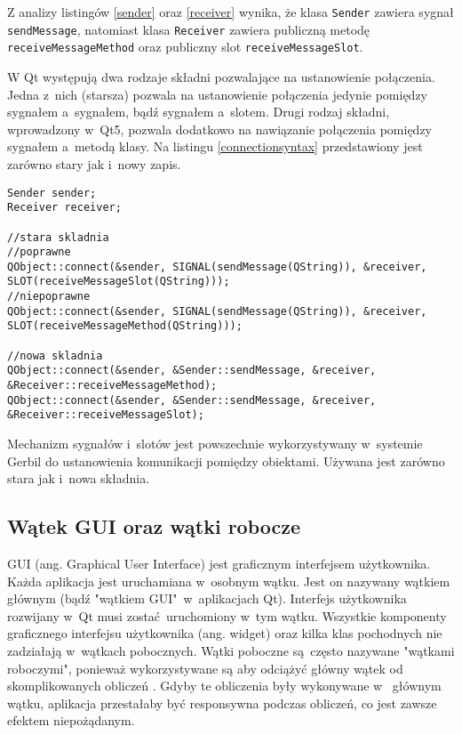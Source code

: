 Z analizy listingów \ref{sender} oraz \ref{receiver} wynika, że klasa \lstinline{Sender} zawiera sygnał \lstinline{sendMessage}, natomiast klasa \lstinline{Receiver} zawiera publiczną metodę \lstinline{receiveMessageMethod} oraz publiczny slot \lstinline{receiveMessageSlot}.

W Qt występują dwa rodzaje składni pozwalające na ustanowienie połączenia. Jedna z~nich (starsza) pozwala na ustanowienie połączenia jedynie pomiędzy sygnałem a~sygnałem, bądź sygnałem a~slotem. Drugi rodzaj składni, wprowadzony w~Qt5, pozwala dodatkowo na nawiązanie połączenia pomiędzy sygnałem a~metodą klasy. Na listingu \ref{connectionsyntax} przedstawiony jest zarówno stary jak i~nowy zapis.

\begin{minipage}{\textwidth}
	\begin{lstlisting}[label=connectionsyntax, caption={Składnia tworzenia połączeń między obiektami},alsoletter={()[].=}]
Sender sender;
Receiver receiver;

//stara skladnia
//poprawne
QObject::connect(&sender, SIGNAL(sendMessage(QString)), &receiver, SLOT(receiveMessageSlot(QString)));
//niepoprawne
QObject::connect(&sender, SIGNAL(sendMessage(QString)), &receiver, SLOT(receiveMessageMethod(QString)));

//nowa skladnia
QObject::connect(&sender, &Sender::sendMessage, &receiver, &Receiver::receiveMessageMethod);
QObject::connect(&sender, &Sender::sendMessage, &receiver, &Receiver::receiveMessageSlot);
	\end{lstlisting}
\end{minipage}

Mechanizm sygnałów i~slotów jest powszechnie wykorzystywany w~systemie Gerbil do ustanowienia komunikacji pomiędzy obiektami. Używana jest zarówno stara jak i~nowa składnia.

\subsection{Wątek GUI oraz wątki robocze}
GUI (ang. Graphical User Interface) jest graficznym interfejsem użytkownika. Każda aplikacja jest uruchamiana w~osobnym wątku. Jest on nazywany wątkiem głównym (bądź "wątkiem GUI"~w~aplikacjach Qt). Interfejs użytkownika rozwijany w~Qt musi zostać uruchomiony w~tym wątku. Wszystkie komponenty graficznego interfejsu użytkownika (ang. widget) oraz kilka klas pochodnych nie zadziałają w~wątkach pobocznych. Wątki poboczne są często nazywane "wątkami roboczymi", ponieważ wykorzystywane są aby odciążyć główny wątek od skomplikowanych obliczeń \cite{Qtdoc}. Gdyby te obliczenia były wykonywane w~ głównym wątku, aplikacja przestałaby być responsywna podczas obliczeń, co jest zawsze efektem niepożądanym.

